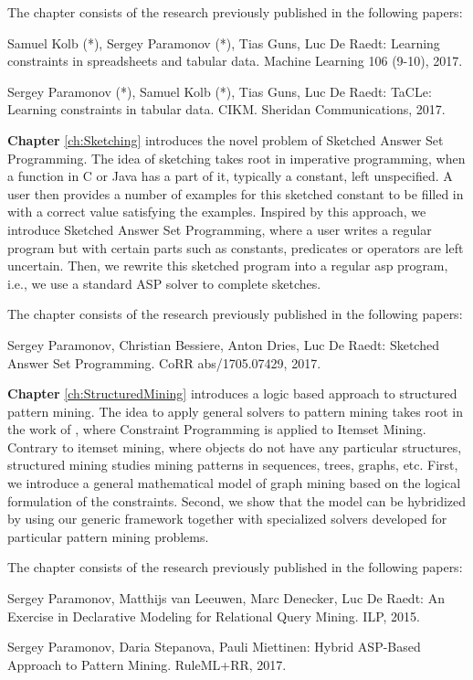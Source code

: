 The chapter consists of the research previously published in the following papers:

\begin{addmargin}[2em]{2em}
Samuel Kolb (*), Sergey Paramonov (*), Tias Guns, Luc De Raedt:
  Learning constraints in spreadsheets and tabular data. Machine
  Learning 106 (9-10), 2017.


Sergey Paramonov (*), Samuel Kolb (*), Tias Guns, Luc De Raedt:
TaCLe: Learning constraints in tabular data. CIKM. Sheridan
Communications, 2017.
\end{addmargin}


\textbf{Chapter} \ref{ch:Sketching} introduces the novel problem of
Sketched Answer Set Programming. The idea of sketching takes root in
imperative programming, when a function in C or Java has a part of it,
typically a constant, left unspecified. A user then provides a number
of examples for this sketched constant to be filled in with a
correct value satisfying the examples. Inspired by this approach, we
introduce Sketched Answer Set Programming, where a user writes a
regular program but with certain parts such as constants, predicates
or operators are left uncertain. Then, we rewrite this sketched
program into a regular \acrlong{asp} program, i.e., we use a standard ASP solver
to complete sketches.


The chapter consists of the research previously published in the following papers:
\begin{addmargin}[2em]{2em}
  Sergey Paramonov, Christian Bessiere, Anton Dries, Luc De Raedt:
  Sketched Answer Set Programming. CoRR abs/1705.07429, 2017.
\end{addmargin}


\textbf{Chapter} \ref{ch:StructuredMining} introduces a logic
based approach to structured pattern mining. The idea to apply general
solvers to pattern mining takes root in the work of
\cite{declrativeapproach}, where Constraint Programming is applied to
Itemset Mining. Contrary to itemset mining, where objects do not have
any particular structures, structured mining studies mining patterns
in sequences, trees, graphs, etc. First, we introduce a general
mathematical model of graph mining based on the logical formulation of
the constraints. Second, we show that the model can be hybridized by
using our generic framework together with specialized solvers
developed for particular pattern mining problems.

The chapter consists of the research previously published in the following papers:
\begin{addmargin}[2em]{2em}
Sergey Paramonov, Matthijs van Leeuwen, Marc Denecker, Luc De Raedt:
An Exercise in Declarative Modeling for Relational Query Mining. ILP, 
2015.


Sergey Paramonov, Daria Stepanova, Pauli Miettinen:
Hybrid ASP-Based Approach to Pattern Mining. RuleML+RR, 2017.
\end{addmargin}


